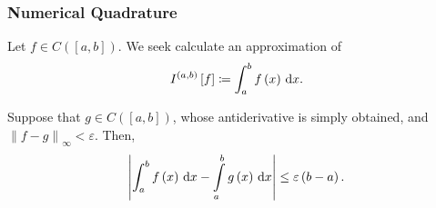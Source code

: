 \begin{frame}
    \frametitle{
        Numerical Quadrature~\cite[p.~397]{salgado_classical_2022}
    }

    Let
    \begin{math}
        f\in
        C\left(
        \left[a,b\right]
        \right)
    \end{math}.
    We seek calculate an approximation of
    \begin{equation*}
        I^{\left(a,b\right)}
        \left[f\right]\coloneqq
        \int_{a}^{b}
        f\left(x\right)
        \dl x.
    \end{equation*}

    Suppose that
    \begin{math}
        g\in
        C\left(
        \left[a,b\right]
        \right)
    \end{math},
    whose antiderivative is simply obtained, and
    \begin{math}
        {\left\|f-g\right\|}_{\infty}<
        \varepsilon
    \end{math}.
    Then,
    \begin{equation}
        \left|
        \int_{a}^{b}
        f\left(x\right)
        \dl x-
        \int\limits_{a}^{b}
        g\left(x\right)
        \dl x
        \right|\leq
        \varepsilon
        \left(b-a\right).
    \end{equation}


\end{frame}
